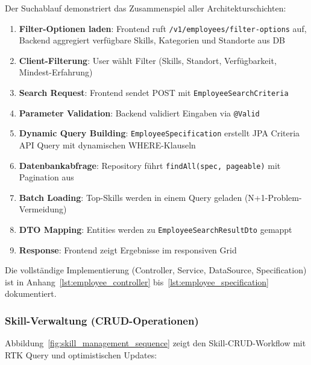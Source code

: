 Der Suchablauf demonstriert das Zusammenspiel aller Architekturschichten:
\begin{enumerate}[noitemsep]
    \item \textbf{Filter-Optionen laden}: Frontend ruft \texttt{/v1/employees/filter-options} auf, Backend aggregiert verfügbare Skills, Kategorien und Standorte aus DB
    \item \textbf{Client-Filterung}: User wählt Filter (Skills, Standort, Verfügbarkeit, Mindest-Erfahrung)
    \item \textbf{Search Request}: Frontend sendet POST mit \texttt{EmployeeSearchCriteria}
    \item \textbf{Parameter Validation}: Backend validiert Eingaben via \texttt{@Valid}
    \item \textbf{Dynamic Query Building}: \texttt{EmployeeSpecification} erstellt JPA Criteria API Query mit dynamischen WHERE-Klauseln
    \item \textbf{Datenbankabfrage}: Repository führt \texttt{findAll(spec, pageable)} mit Pagination aus
    \item \textbf{Batch Loading}: Top-Skills werden in einem Query geladen (N+1-Problem-Vermeidung)
    \item \textbf{DTO Mapping}: Entities werden zu \texttt{EmployeeSearchResultDto} gemappt
    \item \textbf{Response}: Frontend zeigt Ergebnisse im responsiven Grid
\end{enumerate}

Die vollständige Implementierung (Controller, Service, DataSource, Specification) ist in Anhang~\ref{lst:employee_controller} bis~\ref{lst:employee_specification} dokumentiert.

\subsubsection{Skill-Verwaltung (CRUD-Operationen)}

Abbildung~\ref{fig:skill_management_sequence} zeigt den Skill-CRUD-Workflow mit RTK Query und optimistischen Updates:

